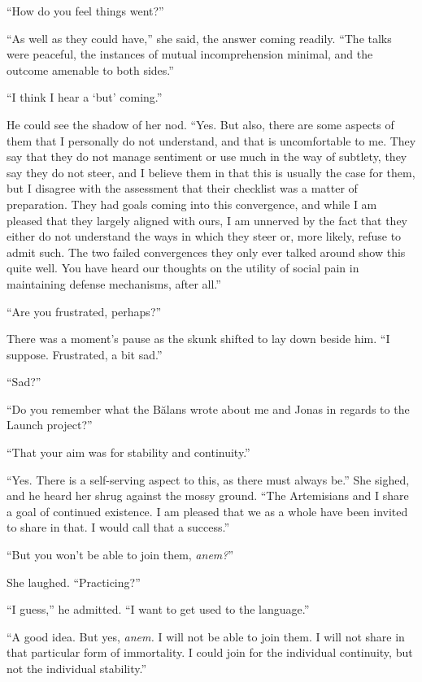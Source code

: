 ``How do you feel things went?''

``As well as they could have,'' she said, the answer coming readily. ``The talks were peaceful, the instances of mutual incomprehension minimal, and the outcome amenable to both sides.''

``I think I hear a `but' coming.''

He could see the shadow of her nod. ``Yes. But also, there are some aspects of them that I personally do not understand, and that is uncomfortable to me. They say that they do not manage sentiment or use much in the way of subtlety, they say they do not steer, and I believe them in that this is usually the case for them, but I disagree with the assessment that their checklist was a matter of preparation. They had goals coming into this convergence, and while I am pleased that they largely aligned with ours, I am unnerved by the fact that they either do not understand the ways in which they steer or, more likely, refuse to admit such. The two failed convergences they only ever talked around show this quite well. You have heard our thoughts on the utility of social pain in maintaining defense mechanisms, after all.''

``Are you frustrated, perhaps?''

There was a moment's pause as the skunk shifted to lay down beside him. ``I suppose. Frustrated, a bit sad.''

``Sad?''

``Do you remember what the Bălans wrote about me and Jonas in regards to the Launch project?''

``That your aim was for stability and continuity.''

``Yes. There is a self-serving aspect to this, as there must always be.'' She sighed, and he heard her shrug against the mossy ground. ``The Artemisians and I share a goal of continued existence. I am pleased that we as a whole have been invited to share in that. I would call that a success.''

``But you won't be able to join them, \emph{anem?}''

She laughed. ``Practicing?''

``I guess,'' he admitted. ``I want to get used to the language.''

``A good idea. But yes, \emph{anem.} I will not be able to join them. I will not share in that particular form of immortality. I could join for the individual continuity, but not the individual stability.''


